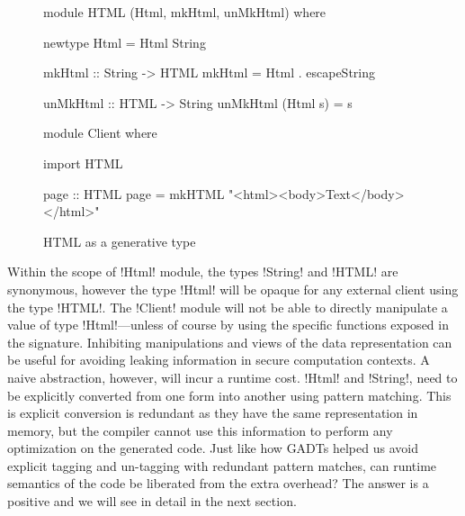 \documentclass[screen,nonacm]{acmart}
\begin{document}
\begin{figure}[ht]
\centering
\begin{minipage}[ht]{0.5\linewidth}
\begin{CenteredBox}
\begin{code}
module HTML (Html, mkHtml, unMkHtml)
where

newtype Html = Html String

mkHtml :: String -> HTML
mkHtml = Html . escapeString

unMkHtml :: HTML -> String
unMkHtml (Html s) = s
\end{code}
\end{CenteredBox}
\end{minipage}%
\begin{minipage}[ht]{0.5\linewidth}
\begin{CenteredBox}
\begin{code}
module Client
where

import HTML

page :: HTML
page = mkHTML "<html><body>Text</body></html>"





\end{code}
\end{CenteredBox}
\end{minipage}
\caption{HTML as a generative type}
\label{fig:html-generative-type}
\end{figure}

Within the scope of !Html! module, the types !String! and !HTML! are
synonymous, however the type !Html! will be opaque for any
external client using the type !HTML!. The !Client! module will not be
able to directly manipulate a value of type !Html!---unless
of course by using the specific functions exposed in the
signature. Inhibiting manipulations and views of the data
representation can be useful for avoiding leaking information in
secure computation contexts. A naive abstraction, however,
will incur a runtime cost. !Html! and !String!, need to be explicitly
converted from one form into another using pattern matching.
This is explicit conversion is redundant as they have the same
representation in memory, but the compiler cannot use this
information to perform any optimization on the generated code.
Just like how GADTs helped us avoid explicit tagging and un-tagging
with redundant pattern matches, can runtime semantics of the code
be liberated from the extra overhead? The answer is a positive and we
will see in detail in the next section.
\end{document}

